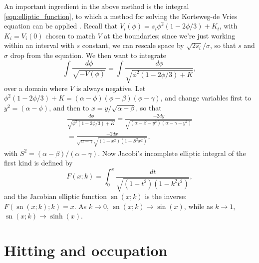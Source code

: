 \documentclass{article}
\DeclareMathOperator{\sn}{sn}
\begin{document}
An important ingredient in the above method is the integral \eqref{eqn:elliptic_function},
to which a method for solving the Korteweg-de Vries equation can be applied \citep{NEQwiki}.
Recall that $V_i(\phi) =  s_i \phi^2(1-2\phi/3) + K_i$, with $K_i = V_i(0)$ chosen to match $V$ at the boundaries;
since we're just working within an interval with $s$ constant, we can rescale space by $\sqrt{2 s_i}/\sigma$,
so that $s$ and $\sigma$ drop from the equation.
We then want to integrate
\[
    \int \frac{ d\phi }{ \sqrt{-V(\phi)} } = 
         \int \frac{ d\phi }{ \sqrt{ \phi^2 (1-2\phi/3) + K } } ,
\]
over a domain where $V$ is always negative.
Let $\phi^2(1-2\phi/3)+K = (\alpha-\phi)(\phi-\beta)(\phi-\gamma)$,
and change variables first to $y^2=(\alpha-\phi)$, 
and then to $x = y/\sqrt{\alpha-\beta}$, so that
\begin{align*}
    \frac{ d\phi }{ \sqrt{ \phi^2 (1-2\phi/3) + K } } 
        = \frac{ - 2 dy }{ \sqrt{ (\alpha-\beta-y^2) (\alpha-\gamma-y^2) } } \\
        = \frac{ - 2 dx }{ \sqrt{\alpha-\gamma} \sqrt{ (1-x^2) (1-S^2 x^2) } } ,
\end{align*}
with $S^2 = (\alpha-\beta)/(\alpha-\gamma)$.
Now Jacobi's incomplete elliptic integral of the first kind is defined by
\[
    F(x;k) = \int_0^x \frac{dt}{\sqrt{ (1-t^2)(1-k^2t^2) }} ,
\]
and the Jacobian elliptic function $\sn(x;k)$ is the inverse: $F(\sn(x;k);k) = x$.
As $k \to 0$, $\sn(x;k) \to \sin(x)$, while as $k \to 1$, $\sn(x;k) \to \sinh(x)$.




\section{Hitting and occupation}
\label{apx:hitting_occupation}
\end{document}
